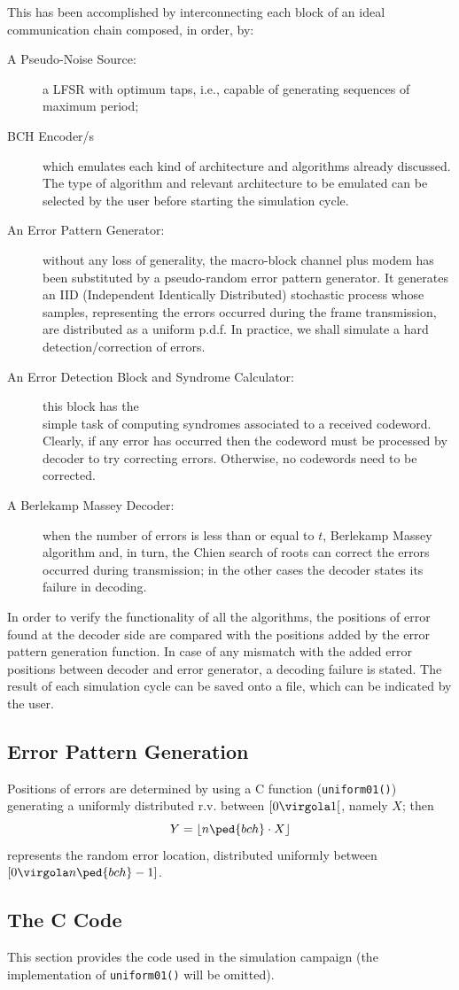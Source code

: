 This has been accomplished by interconnecting each block of an ideal communication chain composed, in order, by:
\begin{description}
\item[A Pseudo-Noise Source:] a LFSR with optimum taps, i.e., capable of generating sequences of maximum period;
\item[BCH Encoder/s] which emulates each kind of architecture and algorithms already discussed. The type of algorithm and relevant architecture to be emulated can be selected by the user before starting the simulation cycle.
\item[An Error Pattern Generator:] without any loss of generality, the macro-block channel plus modem has been substituted by a pseudo-random error pattern generator. It generates an IID (Independent Identically Distributed) stochastic process whose samples, representing the errors occurred during the frame transmission, are distributed as a uniform p.d.f. In practice, we shall simulate a hard detection/correction of errors.
\item[An Error Detection Block and Syndrome Calculator:] this block has the \\
    simple task of computing syndromes associated to a received codeword. Clearly, if any error has occurred then the codeword must be processed by decoder to try correcting errors. Otherwise, no codewords need to be corrected.
\item[A Berlekamp Massey Decoder:] when the number of errors is less than or equal to \(t\), Berlekamp Massey algorithm and, in turn, the Chien search of roots can correct the errors occurred during transmission; in the other cases the decoder states its failure in decoding.
\end{description}

In order to verify the functionality of all the algorithms, the positions of error found at the decoder side are compared with the positions added by the error pattern generation function. In case of any mismatch with the added error positions between decoder and error generator, a decoding failure is stated. The result of each simulation cycle can be saved onto a file, which can be indicated by the user.


\subsection{Error Pattern Generation}

Positions of errors are determined by using a C function (\texttt{uniform01()}) generating a uniformly distributed r.v. between \([0\virgola1[\), namely \(X\); then
\[
Y = \lfloor n\ped{bch}\cdot X \rfloor
\]
represents the random error location, distributed uniformly between \([0\virgola n\ped{bch}-1]\).

\subsection{The C Code}

This section provides the code used in the simulation campaign (the implementation of \texttt{uniform01()} will be omitted).









